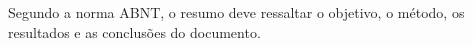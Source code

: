 \documentclass[12pt,				%
	openright,			%
	oneside,			%
	a4paper,			%
	english,			%
	brazil				%
	]{abntex2}
\begin{document}
\pagebreak

%
%

%


\setlength{\absparsep}{18pt} %
\begin{resumo}
Segundo a norma ABNT, o resumo deve ressaltar o  objetivo, o método, os resultados e as conclusões do documento.

 

\end{resumo}

%
%  





\end{document}
